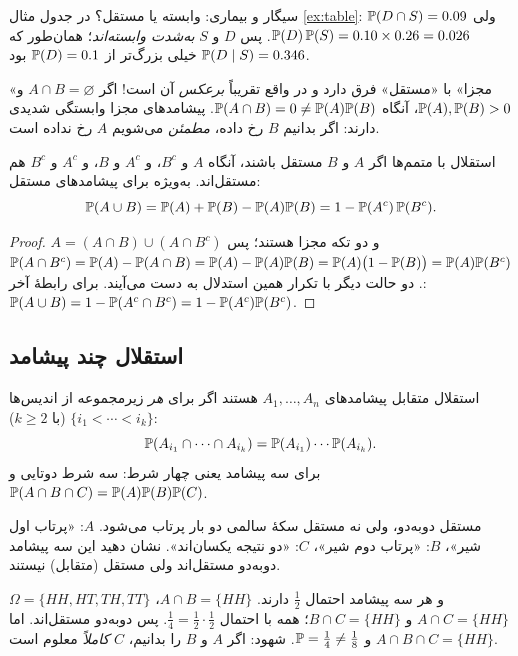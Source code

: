 \begin{example}{سیگار و بیماری: وابسته یا مستقل؟}
در جدول مثال \ref{ex:table}: $\P(D\cap S)=0.09$ ولی $\P(D)\,\P(S)=0.10\times0.26=0.026$. پس $D$ و $S$ \emph{به‌شدت وابسته‌اند}؛ همان‌طور که $\P(D\mid S)=0.346$ خیلی بزرگ‌تر از $\P(D)=0.1$ بود.
\end{example}

\begin{warning}
«مجزا» با «مستقل» فرق دارد و در واقع تقریباً \emph{برعکس} آن است! اگر $A\cap B=\varnothing$ و $\P(A),\P(B)>0$، آنگاه $\P(A\cap B)=0\ne\P(A)\P(B)$. پیشامدهای مجزا وابستگی شدیدی دارند: اگر بدانیم $B$ رخ داده، \emph{مطمئن} می‌شویم $A$ رخ نداده است.
\end{warning}

\begin{theorem}[label=thm:indep-complement]{استقلال با متمم‌ها}
اگر $A$ و $B$ مستقل باشند، آنگاه $A$ و $B^c$، و $A^c$ و $B$، و $A^c$ و $B^c$ هم مستقل‌اند. به‌ویژه برای پیشامدهای مستقل:
\[ \P(A\cup B)=\P(A)+\P(B)-\P(A)\P(B)=1-\P(A^c)\,\P(B^c). \]
\end{theorem}

\begin{proof}
$A=(A\cap B)\cup(A\cap B^c)$ و دو تکه مجزا هستند؛ پس
$\P(A\cap B^c)=\P(A)-\P(A\cap B)=\P(A)-\P(A)\P(B)=\P(A)\bigl(1-\P(B)\bigr)=\P(A)\P(B^c)$.
دو حالت دیگر با تکرار همین استدلال به دست می‌آیند. برای رابطهٔ آخر: $\P(A\cup B)=1-\P(A^c\cap B^c)=1-\P(A^c)\P(B^c)$.
\end{proof}

\subsection{استقلال چند پیشامد}

\begin{definition}[label=def:mutual-indep]{استقلال متقابل}
پیشامدهای $A_1,\dots,A_n$  هستند اگر برای \emph{هر} زیرمجموعه از اندیس‌ها $\{i_1<\cdots<i_k\}$ (با $k\ge2$):
\[ \P(A_{i_1}\cap\cdots\cap A_{i_k})=\P(A_{i_1})\cdots\P(A_{i_k}). \]
برای سه پیشامد یعنی چهار شرط: سه شرط دوتایی و $\P(A\cap B\cap C)=\P(A)\P(B)\P(C)$.
\end{definition}

\begin{example}[label=ex:pairwise]{مستقل دوبه‌دو، ولی نه مستقل}
سکهٔ سالمی دو بار پرتاب می‌شود. $A$: «پرتاب اول شیر»، $B$: «پرتاب دوم شیر»، $C$: «دو نتیجه یکسان‌اند». نشان دهید این سه پیشامد دوبه‌دو مستقل‌اند ولی مستقل (متقابل) نیستند.
\begin{solution}
$\Omega=\{HH,HT,TH,TT\}$ و هر سه پیشامد احتمال $\tfrac12$ دارند. $A\cap B=\{HH\}$، $A\cap C=\{HH\}$ و $B\cap C=\{HH\}$؛ همه با احتمال $\tfrac14=\tfrac12\cdot\tfrac12$. پس دوبه‌دو مستقل‌اند. اما $A\cap B\cap C=\{HH\}$ و $\P=\tfrac14\ne\tfrac18$. شهود: اگر $A$ و $B$ را بدانیم، $C$ \emph{کاملاً} معلوم است.
\end{solution}
\end{example}

